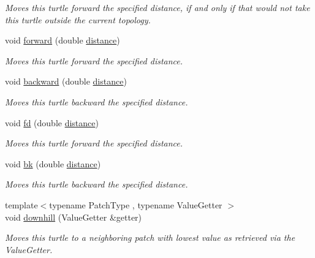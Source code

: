 \begin{DoxyCompactItemize}
\begin{DoxyCompactList}\small\item\em Moves this turtle forward the specified distance, if and only if that would not take this turtle outside the current topology. \end{DoxyCompactList}\item 
void \hyperlink{classrepast_1_1relogo_1_1_turtle_a7521d84463d7b96a1db66019bdbb8f49}{forward} (double \hyperlink{classrepast_1_1relogo_1_1_turtle_af1f309528154fa89567e4c4e7b6660b6}{distance})
\begin{DoxyCompactList}\small\item\em Moves this turtle forward the specified distance. \end{DoxyCompactList}\item 
void \hyperlink{classrepast_1_1relogo_1_1_turtle_a828a30b94996d99ad93db94840e8bc44}{backward} (double \hyperlink{classrepast_1_1relogo_1_1_turtle_af1f309528154fa89567e4c4e7b6660b6}{distance})
\begin{DoxyCompactList}\small\item\em Moves this turtle backward the specified distance. \end{DoxyCompactList}\item 
void \hyperlink{classrepast_1_1relogo_1_1_turtle_a6af06d493381cab6a9bf6ca5dd7a84bc}{fd} (double \hyperlink{classrepast_1_1relogo_1_1_turtle_af1f309528154fa89567e4c4e7b6660b6}{distance})
\begin{DoxyCompactList}\small\item\em Moves this turtle forward the specified distance. \end{DoxyCompactList}\item 
void \hyperlink{classrepast_1_1relogo_1_1_turtle_a2e85915f73032aec4664218aff5dfee8}{bk} (double \hyperlink{classrepast_1_1relogo_1_1_turtle_af1f309528154fa89567e4c4e7b6660b6}{distance})
\begin{DoxyCompactList}\small\item\em Moves this turtle backward the specified distance. \end{DoxyCompactList}\item 
{\footnotesize template$<$typename Patch\-Type , typename Value\-Getter $>$ }\\void \hyperlink{classrepast_1_1relogo_1_1_turtle_a5ea9ce6c630dfce7a2db84926f11ff1c}{downhill} (Value\-Getter \&getter)
\begin{DoxyCompactList}\small\item\em Moves this turtle to a neighboring patch with lowest value as retrieved via the Value\-Getter. \end{DoxyCompactList}\item 

\end{DoxyCompactItemize}
